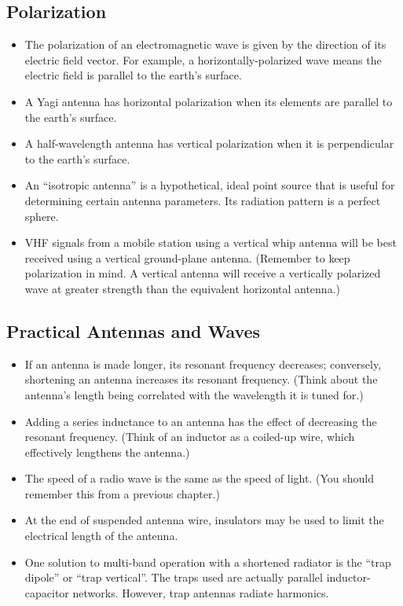 \documentclass[letterpaper,12pt]{article}
\begin{document}
\subsection{Polarization}

\begin{itemize}
\item The polarization of an electromagnetic wave is given by the direction of its electric field vector.
For example, a horizontally-polarized wave means the electric field is parallel to the earth's surface.
\item A Yagi antenna has horizontal polarization when its elements are parallel to the earth's surface.
\item A half-wavelength antenna has vertical polarization when it is perpendicular to the earth's surface.
\item An ``isotropic antenna'' is a hypothetical, ideal point source that is useful for determining certain antenna parameters.
Its radiation pattern is a perfect sphere.
\item VHF signals from a mobile station using a vertical whip antenna will be best received using a vertical ground-plane antenna.
(Remember to keep polarization in mind. A vertical antenna will receive a vertically polarized wave at greater strength
than the equivalent horizontal antenna.)
\end{itemize}

\subsection{Practical Antennas and Waves}

\begin{itemize}
\item If an antenna is made longer, its resonant frequency decreases; conversely, shortening an antenna increases its resonant frequency.
(Think about the antenna's length being correlated with the wavelength it is tuned for.)
\item Adding a series inductance to an antenna has the effect of decreasing the resonant frequency.
(Think of an inductor as a coiled-up wire, which effectively lengthens the antenna.)
\item The speed of a radio wave is the same as the speed of light. (You should remember this from a previous chapter.)
\item At the end of suspended antenna wire, insulators may be used to limit the electrical length of the antenna.
\item One solution to multi-band operation with a shortened radiator is the ``trap dipole'' or ``trap vertical''.
The traps used are actually parallel inductor-capacitor networks.
However, trap antennas radiate harmonics.
\end{itemize}
\end{document}
